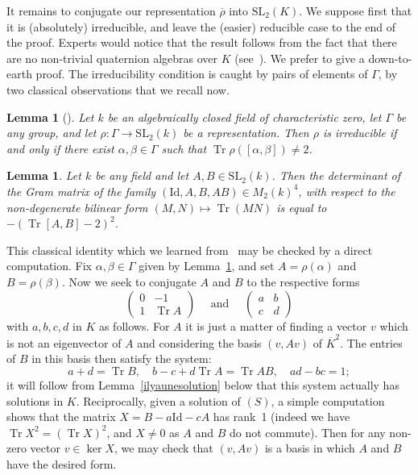 \documentclass[11pt]{article}
\newtheorem{lemma}[theorem]{Lemma}
\theoremstyle{definition}
\newcommand{\tr}{\operatorname{Tr}}
\newcommand{\SL}{\mathrm{SL}}
\newcommand{\id}{\mathrm{Id}}
\begin{document}
It remains to conjugate our representation $\overline{\rho}$ into $\SL_2(K)$.
We suppose first that it is (absolutely) irreducible, and leave the (easier)
reducible case to the end of the proof. Experts would notice that the result
follows from the fact that there are no non-trivial quaternion algebras over
$K$ (see~\cite{MaclachlanReid}). We prefer to give a down-to-earth proof.
The irreducibility condition is caught by pairs of elements of $\Gamma$, by
two classical observations that we recall now.
\begin{lemma}[{\cite[Cor.\,1.2.2]{CullerShalen}}]\label{lem:Irred-CS}
Let $k$ be an algebraically closed field of characteristic zero,
let $\Gamma$ be any group, and let $\rho\colon\Gamma\to\SL_2(k)$ be a
representation. Then $\rho$ is irreducible if and only if there exist
$\alpha,\beta\in\Gamma$ such that $\tr \rho([\alpha,\beta])\neq 2$.
\end{lemma}
\begin{lemma}\label{lem:gram}
Let $k$ be any field and let $A,B\in\SL_2(k)$. Then the determinant of the
Gram matrix of the family $(\id,A,B,AB)\in M_2(k)^4$, with respect to the
non-degenerate bilinear form $(M,N)\mapsto\tr(MN)$ is equal to
$- \left(\tr[A,B]-2\right)^2$.
\end{lemma}
This classical identity which we learned from~\cite{Saito} may be checked
by a direct computation. Fix $\alpha,\beta\in \Gamma$ given by
Lemma~\ref{lem:Irred-CS}, and set $A=\rho(\alpha)$ and $B=\rho(\beta)$.
Now we seek to conjugate $A$ and $B$ to the respective forms
\[ \begin{pmatrix} 0 & -1 \\ 1 & \tr A \end{pmatrix}\quad
\text{ and }\quad\begin{pmatrix} a & b \\ c & d\end{pmatrix} \]
with $a,b,c,d$ in $K$ as follows. For $A$ it is just a matter of finding a
vector $v$ which is not an eigenvector of $A$ and considering the basis
$(v,Av)$ of $\overline{K}^2$. The entries of $B$ in this basis then satisfy
the system:
\begin{equation}\tag{S}
a+d=\tr B,\quad b-c+d\tr A=\tr AB,\quad ad-bc=1;
\end{equation}
it will follow from Lemma~\ref{ilyaunesolution} below that this system
actually has solutions in $K$. Reciprocally, given a solution of $(S)$,
a simple computation shows that the matrix $X=B-a\id-c A$ has rank~1
(indeed we have $\tr X^2=(\tr X)^2$, and $X\ne 0$ as $A$ and $B$ do not
commute). Then for any non-zero vector $v\in \ker X$, we may check that
$(v,Av)$ is a basis in which $A$ and $B$ have the desired form.
\end{document}
